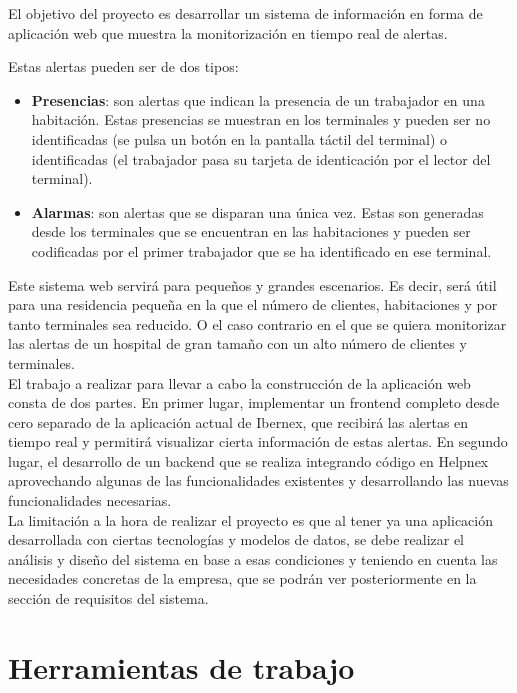 El objetivo del proyecto es desarrollar un sistema de información en forma de aplicación web que muestra la monitorización en tiempo real de alertas. \newline

Estas alertas pueden ser de dos tipos:
\begin{itemize}
    \item \textbf{Presencias}: son alertas que indican la presencia de un trabajador en una habitación. Estas presencias se muestran en los terminales y pueden ser no identificadas (se pulsa un botón en la pantalla táctil del terminal) o identificadas (el trabajador pasa su tarjeta de identicación por el lector del terminal).
    \item \textbf{Alarmas}: son alertas que se disparan una única vez. Estas son generadas desde los terminales que se encuentran en las habitaciones y pueden ser codificadas por el primer trabajador que se ha identificado en ese terminal.    
\end{itemize}

Este sistema web servirá para pequeños y grandes escenarios. Es decir, será útil para una residencia pequeña en la que el número de clientes, habitaciones y por tanto terminales sea reducido. O el caso contrario en el que se quiera monitorizar las alertas de un hospital de gran tamaño con un alto número de clientes y terminales.\\

El trabajo a realizar para llevar a cabo la construcción de la aplicación web consta de dos partes. En primer lugar, implementar un frontend completo desde cero separado de la aplicación actual de Ibernex, que recibirá las alertas en tiempo real y permitirá visualizar cierta información de estas alertas. En segundo lugar, el desarrollo de un backend que se realiza integrando código en Helpnex aprovechando algunas de las funcionalidades existentes y desarrollando las nuevas funcionalidades necesarias. \\

La limitación a la hora de realizar el proyecto es que al tener ya una aplicación desarrollada con ciertas tecnologías y modelos de datos, se debe realizar el análisis y diseño del sistema en base a esas condiciones y teniendo en cuenta las necesidades concretas de la empresa, que se podrán ver posteriormente en la sección de requisitos del sistema.


\section{Herramientas de trabajo}


